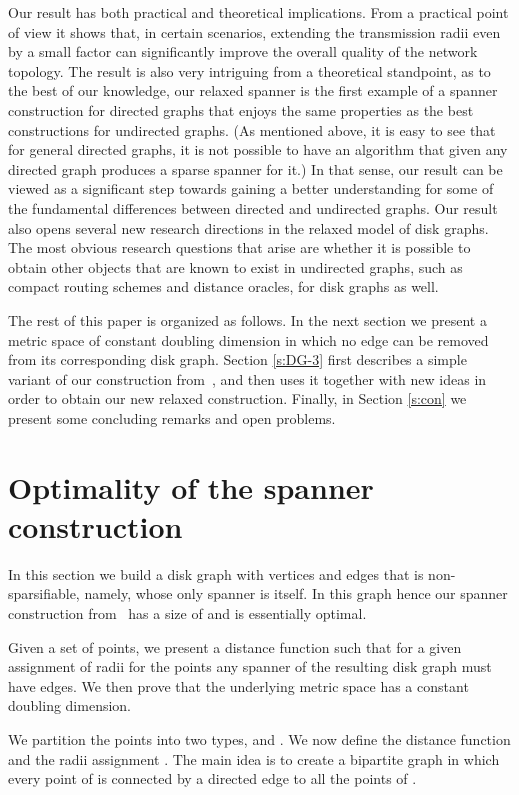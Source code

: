 \documentclass[proceedings]{stacs}
\theoremstyle{plain}\newtheorem{satz}[thm]{Satz}
\theoremstyle{definition}\newtheorem{crucial}[thm]{Crucial Definition}
\begin{document}
Our result has both practical and theoretical implications. From a
practical point of view it shows that, in certain scenarios,
extending the transmission radii even by a small factor can
significantly improve the overall quality of the network topology.
The result is also very intriguing from a theoretical standpoint,
as to the best of our knowledge, our relaxed spanner is the first
example of a spanner construction for directed graphs that enjoys
the same properties as the best constructions for undirected
graphs. (As mentioned above, it is easy to see that for general
directed graphs, it is not possible to have an algorithm that
given any directed graph produces a sparse spanner for it.) In
that sense, our result can be viewed as a significant step towards
gaining a better understanding for some of the fundamental
differences between directed and undirected graphs. Our result
also opens several new research directions in the relaxed model of
disk graphs. The most obvious research questions that arise are
whether it is possible to obtain other objects that are known to
exist in undirected graphs, such as compact routing schemes and
distance oracles, for disk graphs as well.

The rest of this paper is organized as follows. In the next
section
we present a metric space of constant doubling dimension in which
no edge can be removed from its corresponding disk graph. Section
\ref{s:DG-3} first describes a simple variant of our construction
from~\cite{PeRo08}, and then uses it together with new ideas in
order to obtain our new relaxed construction. Finally, in Section
\ref{s:con} we present some concluding remarks and open problems.

\section{Optimality of the spanner construction}
\label{s:Bad-Example}


In this section we build a disk graph  with  vertices and
 edges that is non-sparsifiable, namely, whose only
spanner is  itself. In this graph  hence our
spanner construction from~\cite{PeRo08} has a size of
 and is essentially optimal.

Given a set of points, we present a distance function such that
for a given assignment of radii for the points any spanner of the
resulting disk graph must have  edges. We then prove
that the underlying metric space has a constant doubling
dimension.

We partition the points into two types, 
and . We now define the distance function
 and the radii assignment . The
main idea is to create a bipartite graph  in which every
point of  is connected by a directed edge to all the points of
.
\end{document}
